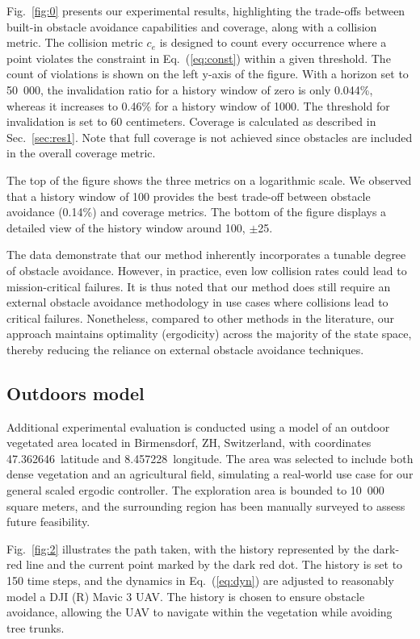 \documentclass[letterpaper,10pt,conference,twoside]{IEEEtran}
\theoremstyle{definition}
\begin{document}
Fig.~\ref{fig:0} presents our experimental results, highlighting the trade-offs between built-in obstacle avoidance capabilities and coverage, along with a collision metric. The collision metric $c_e$ is designed to count every occurrence where a point violates the constraint in Eq.~(\ref{eq:const}) within a given threshold. The count of violations is shown on the left y-axis of the figure. With a horizon set to 50~000, the invalidation ratio for a history window of zero is only 0.044\%, whereas it increases to 0.46\% for a history window of 1000. The threshold for invalidation is set to 60 centimeters. Coverage is calculated as described in Sec.~\ref{sec:res1}. Note that full coverage is not achieved since obstacles are included in the overall coverage metric.

The top of the figure shows the three metrics on a logarithmic scale. We observed that a history window of 100 provides the best trade-off between obstacle avoidance (0.14\%) and coverage metrics. The bottom of the figure displays a detailed view of the history window around 100, $\pm$25.

The data demonstrate that our method inherently incorporates a tunable degree of obstacle avoidance. However, in practice, even low collision rates could lead to mission-critical failures. It is thus noted that our method does still require an external obstacle avoidance methodology in use cases where collisions lead to critical failures. Nonetheless, compared to other methods in the literature, our approach maintains optimality (ergodicity) across the majority of the state space, thereby reducing the reliance on external obstacle avoidance techniques.

\subsection{Outdoors model}\label{sec:res3}
\noindent
Additional experimental evaluation is conducted using a model of an outdoor vegetated area located in Birmensdorf, ZH, Switzerland, with coordinates 47.362646\textdegree~latitude and 8.457228\textdegree~longitude. The area was selected to include both dense vegetation and an agricultural field, simulating a real-world use case for our general scaled ergodic controller. The exploration area is bounded to 10~000 square meters, and the surrounding region has been manually surveyed to assess future feasibility.

Fig.~\ref{fig:2} illustrates the path taken, with the history represented by the dark-red line and the current point marked by the dark red dot. The history is set to 150 time steps, and the dynamics in Eq.~(\ref{eq:dyn}) are adjusted to reasonably model a DJI (R) Mavic 3 UAV. The history is chosen to ensure obstacle avoidance, allowing the UAV to navigate within the vegetation while avoiding tree trunks.
\end{document}

